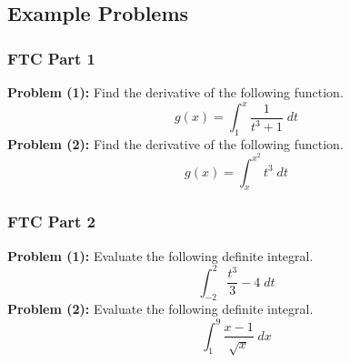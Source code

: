 \subsection{Example Problems}
\subsubsection{FTC Part 1}
\textbf{Problem (1):} Find the derivative of the following function.
$$
g(x) = \int_1^x \frac{1}{t^3 + 1}\;dt
$$
\textbf{Problem (2):} Find the derivative of the following function.
$$
g(x) = \int_x^{x^2} t^3 \;dt
$$
\subsubsection{FTC Part 2}
\textbf{Problem (1):} Evaluate the following definite integral.
$$
\int_{-2}^2 \frac{t^3}{3} - 4 \;dt 
$$
\textbf{Problem (2):} Evaluate the following definite integral.
$$
\int_{1}^9 \frac{x-1}{\sqrt{x}}\;dx
$$

